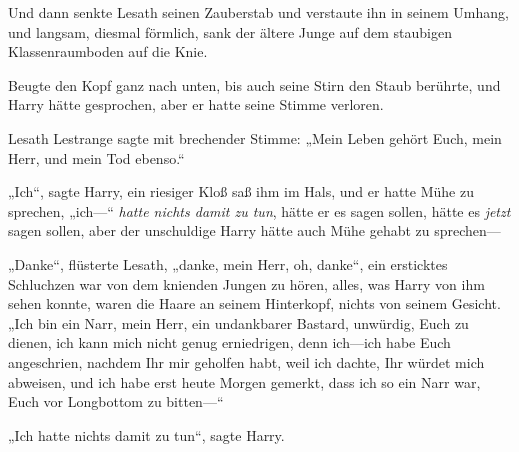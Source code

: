 Und dann senkte Lesath seinen Zauberstab und verstaute ihn in seinem Umhang, und langsam, diesmal förmlich, sank der ältere Junge auf dem staubigen Klassenraumboden auf die Knie.

Beugte den Kopf ganz nach unten, bis auch seine Stirn den Staub berührte, und Harry hätte gesprochen, aber er hatte seine Stimme verloren.

Lesath Lestrange sagte mit brechender Stimme: „Mein Leben gehört Euch, mein Herr, und mein Tod ebenso.“

„Ich“, sagte Harry, ein riesiger Kloß saß ihm im Hals, und er hatte Mühe zu sprechen, „ich—“ \emph{hatte nichts damit zu tun}, hätte er es sagen sollen, hätte es \emph{jetzt} sagen sollen, aber der unschuldige Harry hätte auch Mühe gehabt zu sprechen—

„Danke“, flüsterte Lesath, „danke, mein Herr, oh, danke“, ein ersticktes Schluchzen war von dem knienden Jungen zu hören, alles, was Harry von ihm sehen konnte, waren die Haare an seinem Hinterkopf, nichts von seinem Gesicht. „Ich bin ein Narr, mein Herr, ein undankbarer Bastard, unwürdig, Euch zu dienen, ich kann mich nicht genug erniedrigen, denn ich—ich habe Euch angeschrien, nachdem Ihr mir geholfen habt, weil ich dachte, Ihr würdet mich abweisen, und ich habe erst heute Morgen gemerkt, dass ich so ein Narr war, Euch vor Longbottom zu bitten—“

„Ich hatte nichts damit zu tun“, sagte Harry.

